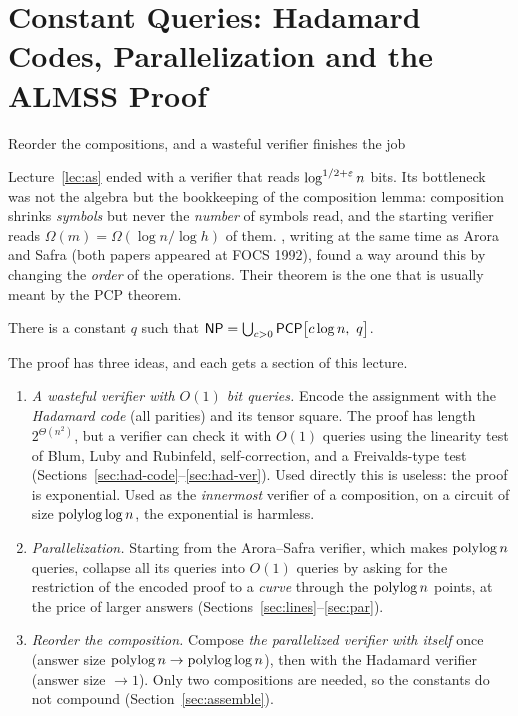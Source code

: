 \chapter{Constant Queries: Hadamard Codes, Parallelization and the ALMSS Proof}
\label{lec:alm}

{\sffamily\large\color{softgray}Reorder the compositions, and a wasteful verifier finishes the job\par}
\vspace{0.5em}

\noindent
Lecture~\ref{lec:as} ended with a verifier that reads $\log^{1/2+\varepsilon}n$ bits.  Its bottleneck was not the
algebra but the bookkeeping of the composition lemma: composition shrinks \emph{symbols} but never the \emph{number}
of symbols read, and the starting verifier reads $\Omega(m)=\Omega(\log n/\log h)$ of them.
\citet{ALMSS98}, writing at the same time as Arora and Safra (both papers appeared at FOCS 1992), found a way
around this by changing the \emph{order} of the operations.  Their theorem is the one that is usually meant by the PCP theorem.

\begin{theorem}\label{thm:alm}
There is a constant $q$ such that $\mathsf{NP}=\bigcup_{c>0}\mathsf{PCP}\bigl[c\log n,\ q\bigr]$.
\end{theorem}

\noindent
The proof has three ideas, and each gets a section of this lecture.
\begin{enumerate}
  \item \emph{A wasteful verifier with $O(1)$ bit queries.}  Encode the assignment with the \emph{Hadamard code} (all
        parities) and its tensor square.  The proof has length $2^{\Theta(n^2)}$, but a verifier can check it with
        $O(1)$ queries using the linearity test of Blum, Luby and Rubinfeld, self-correction, and a Freivalds-type test
        (Sections~\ref{sec:had-code}--\ref{sec:had-ver}).  Used directly this is useless: the proof is exponential.
        Used as the \emph{innermost} verifier of a composition, on a circuit of size $\operatorname{polylog}\log n$, the exponential is harmless.
  \item \emph{Parallelization.}  Starting from the Arora--Safra verifier, which makes $\operatorname{polylog} n$ queries, collapse
        all its queries into $O(1)$ queries by asking for the restriction of the encoded proof to a \emph{curve}
        through the $\operatorname{polylog} n$ points, at the price of larger answers (Sections~\ref{sec:lines}--\ref{sec:par}).
  \item \emph{Reorder the composition.}  Compose \emph{the parallelized verifier with itself} once (answer size
        $\operatorname{polylog} n\to\operatorname{polylog}\log n$), then with the Hadamard verifier (answer size $\to1$).
        Only two compositions are needed, so the constants do not compound (Section~\ref{sec:assemble}).
\end{enumerate}

